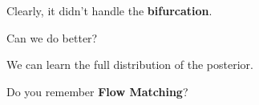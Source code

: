 \documentclass[aspectratio=169,xcolor=dvipsnames,svgnames,x11names,fleqn]{beamer}
\begin{document}
\begin{frame}{}

\Large

\begin{center}
{

\color{algoColorKey}

Clearly, it didn't handle  the \textbf{bifurcation}.

\vspace{10pt}


\color{pinnColor}

Can we do better?

}

\pause 

\vspace{10pt}

We can learn the full distribution of the posterior.

\pause 

\vspace{10pt}

\color{trueColor}

Do you remember \textbf{Flow Matching}?



\end{center}

\end{frame}
\end{document}
